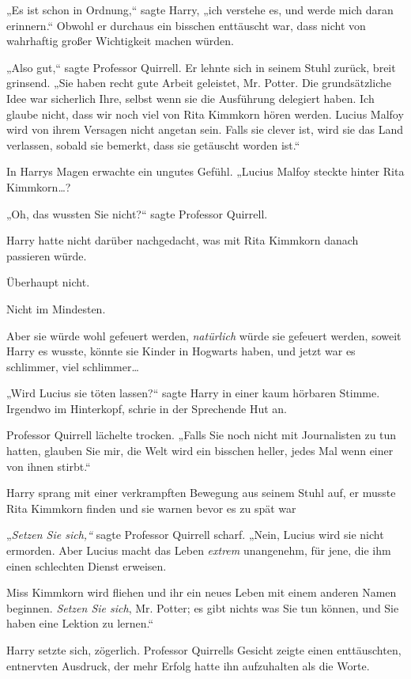 {„Es ist schon in Ordnung,“ sagte Harry, „ich verstehe es, und werde mich daran erinnern.“ Obwohl er durchaus ein bisschen enttäuscht war, dass nicht von wahrhaftig großer Wichtigkeit machen würden.

„Also gut,“ sagte Professor Quirrell. Er lehnte sich in seinem Stuhl zurück, breit grinsend. „Sie haben recht gute Arbeit geleistet, Mr. Potter. Die grundsätzliche Idee war sicherlich Ihre, selbst wenn sie die Ausführung delegiert haben. Ich glaube nicht, dass wir noch viel von Rita Kimmkorn hören werden. Lucius Malfoy wird von ihrem Versagen nicht angetan sein. Falls sie clever ist, wird sie das Land verlassen, sobald sie bemerkt, dass sie getäuscht worden ist.“

In Harrys Magen erwachte ein ungutes Gefühl. „Lucius Malfoy steckte hinter Rita Kimmkorn…?

„Oh, das wussten Sie nicht?“ sagte Professor Quirrell.

Harry hatte nicht darüber nachgedacht, was mit Rita Kimmkorn danach passieren würde.

Überhaupt nicht.

Nicht im Mindesten.

Aber sie würde wohl gefeuert werden, \emph{natürlich} würde sie gefeuert werden, soweit Harry es wusste, könnte sie Kinder in Hogwarts haben, und jetzt war es schlimmer, viel schlimmer…

„Wird Lucius sie töten lassen?“ sagte Harry in einer kaum hörbaren Stimme. Irgendwo im Hinterkopf, schrie in der Sprechende Hut an.

Professor Quirrell lächelte trocken. „Falls Sie noch nicht mit Journalisten zu tun hatten, glauben Sie mir, die Welt wird ein bisschen heller, jedes Mal wenn einer von ihnen stirbt.“

Harry sprang mit einer verkrampften Bewegung aus seinem Stuhl auf, er musste Rita Kimmkorn finden und sie warnen bevor es zu spät war \later

„\emph{Setzen Sie sich,“} sagte Professor Quirrell scharf. „Nein, Lucius wird sie nicht ermorden. Aber Lucius macht das Leben \emph{extrem} unangenehm, für jene, die ihm einen schlechten Dienst erweisen.

Miss Kimmkorn wird fliehen und ihr ein neues Leben mit einem anderen Namen beginnen. \emph{Setzen Sie sich}, Mr. Potter; es gibt nichts was Sie tun können, und Sie haben eine Lektion zu lernen.“

Harry setzte sich, zögerlich. Professor Quirrells Gesicht zeigte einen enttäuschten, entnervten Ausdruck, der mehr Erfolg hatte ihn aufzuhalten als die Worte.

}

